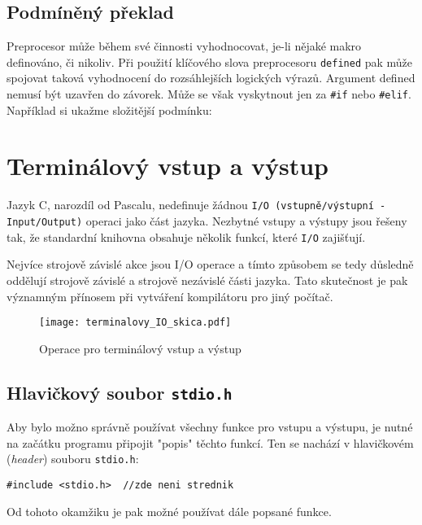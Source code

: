     \subsection{Podmíněný překlad}  
      Preprocesor může během své činnosti vyhodnocovat, je-li nějaké makro definováno, či nikoliv. 
      Při použití klíčového slova preprocesoru \texttt{defined} pak může spojovat taková 
      vyhodnocení do rozsáhlejších logických výrazů. Argument defined nemusí být uzavřen do 
      závorek. Může se však vyskytnout jen za \lstinline[basicstyle=\ttfamily]!#if! nebo 
      \lstinline[basicstyle=\ttfamily]!#elif!. Například si ukažme složitější podmínku:


  \section{Terminálový vstup a výstup}
    Jazyk C, narozdíl od Pascalu, nedefinuje žádnou \texttt{I/O (vstup\-ně/výstup\-ní 
    -In\-put/Out\-put)} operaci jako část jazyka. Nezbytné vstupy a výstupy jsou řešeny tak, že 
    standardní knihovna obsahuje několik funkcí, které \texttt{I/O} zajišťují.
  
    Nejvíce strojově závislé akce jsou I/O operace a tímto způsobem se tedy důsledně oddělují 
    strojově závislé a strojově nezávislé části jazyka. Tato skutečnost je pak významným přínosem 
    při vytváření kompilátoru pro jiný počítač.
  
    \begin{figure}[ht!]
      \centering
      \texttt{[image: terminalovy\_IO\_skica.pdf]}
      \caption{Operace pro terminálový vstup a výstup}\label{C:fig_Terminal_IO}
    \end{figure}
  
    \subsection{Hlavičkový soubor \texttt{stdio.h}}
      Aby bylo možno správně používat všechny funkce pro vstupu a výstupu, je nutné na začátku 
      programu připojit "popis" těchto funkcí. Ten se nachází v hlavičkovém (\emph{header}) souboru 
      \lstinline[basicstyle=\ttfamily]!stdio.h!:
  
      \lstinline[basicstyle=\ttfamily]!#include <stdio.h>  //zde neni strednik!
  
      Od tohoto okamžiku je pak možné používat dále popsané funkce.
  
